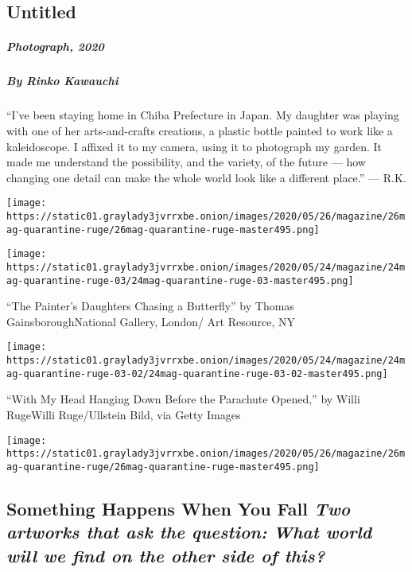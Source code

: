 \hypertarget{untitled-3}{%
\subsection{Untitled}\label{untitled-3}}

\hypertarget{photograph-2020-6}{%
\subparagraph{Photograph, 2020}\label{photograph-2020-6}}

\hypertarget{by-rinko-kawauchi-3}{%
\subparagraph{By Rinko Kawauchi}\label{by-rinko-kawauchi-3}}

``I've been staying home in Chiba Prefecture in Japan. My daughter was
playing with one of her arts-and-crafts creations, a plastic bottle
painted to work like a kaleidoscope. I affixed it to my camera, using it
to photograph my garden. It made me understand the possibility, and the
variety, of the future --- how changing one detail can make the whole
world look like a different place.'' --- R.K.

\texttt{[image: https://static01.graylady3jvrrxbe.onion/images/2020/05/26/magazine/26mag-quarantine-ruge/26mag-quarantine-ruge-master495.png]}

\texttt{[image: https://static01.graylady3jvrrxbe.onion/images/2020/05/24/magazine/24mag-quarantine-ruge-03/24mag-quarantine-ruge-03-master495.png]}

``The Painter's Daughters Chasing a Butterfly'' by Thomas
GainsboroughNational Gallery, London/ Art Resource, NY

\texttt{[image: https://static01.graylady3jvrrxbe.onion/images/2020/05/24/magazine/24mag-quarantine-ruge-03-02/24mag-quarantine-ruge-03-02-master495.png]}

``With My Head Hanging Down Before the Parachute Opened,'' by Willi
RugeWilli Ruge/Ullstein Bild, via Getty Images

\texttt{[image: https://static01.graylady3jvrrxbe.onion/images/2020/05/26/magazine/26mag-quarantine-ruge/26mag-quarantine-ruge-master495.png]}

\hypertarget{something-happens-when-you-fall-two-artworks-that-ask-the-question-what-world-will-we-find-on-the-other-side-of-this}{%
\subsection{\texorpdfstring{Something Happens When You Fall \emph{Two
artworks that ask the question:} \emph{What world will we find on the
other side of
this?}}{Something Happens When You Fall Two artworks that ask the question: What world will we find on the other side of this?}}\label{something-happens-when-you-fall-two-artworks-that-ask-the-question-what-world-will-we-find-on-the-other-side-of-this}}

